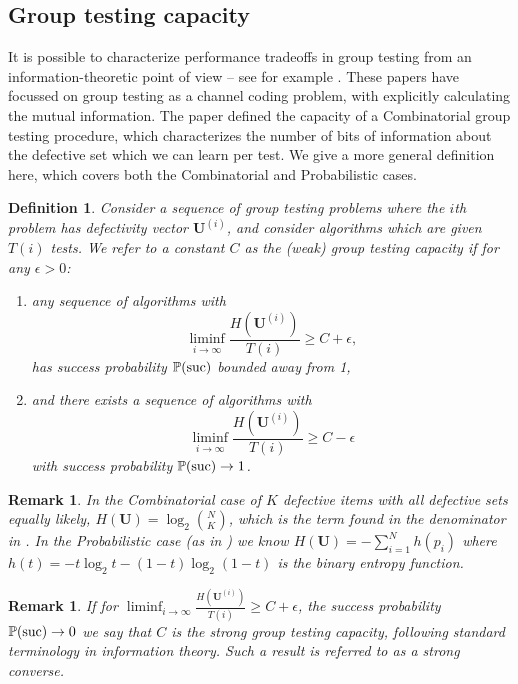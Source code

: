 \documentclass[conference]{IEEEtran}
\newtheorem{definition}[theorem]{Definition}
\newtheorem{remark}[theorem]{Remark}
\newcommand{\vc}[1]{{\mathbf{ #1}}}
\newcommand{\pr}{{\mathbb{P}}}
\newcommand{\suc}{{\rm suc}}
\newcommand{\tends}{\rightarrow \infty}
\begin{document}
\subsection{Group testing capacity}
%
It is possible to characterize performance tradeoffs in group testing 
 from an information-theoretic point of view -- see for example \cite{atia, johnsonc10, johnson33, tan}. These papers have focussed on group testing as a channel coding problem, 
with \cite{atia, tan}
explicitly calculating the mutual information.
The paper \cite{johnsonc10} defined the capacity of a Combinatorial group testing procedure, which characterizes the number of bits of information
about the defective set which we can learn per test. We give a more general definition here,
which covers both the Combinatorial and Probabilistic cases.
%
\begin{definition} \label{def:capacity} Consider a sequence of group testing problems where the $i$th problem
has defectivity vector  $\vc{U}^{(i)}$, and consider algorithms which are given $T(i)$ tests.
We refer to a constant $C$ as the (weak) group testing capacity if for any $\epsilon > 0$:
  \begin{enumerate}
    \item any sequence of algorithms with
      \begin{equation} \label{eq:lower}
        \liminf_{i \tends} \frac{ H(\vc{U}^{(i)}) }{T(i)} \geq C+ \epsilon,
      \end{equation}
      has success probability $\pr(\suc)$ bounded away from 1,
    \item and there exists a sequence of algorithms with
      \begin{equation} \label{eq:upper}
        \liminf_{i \tends} \frac{H(\vc{U}^{(i)}) }{T(i)}  \geq C - \epsilon
      \end{equation}
      with success probability $\pr(\suc) \rightarrow 1$.
  \end{enumerate}
\end{definition}
%
\begin{remark}
In the Combinatorial case of $K$ defective items with all defective sets equally
likely, $ H(\vc{U}) = \log_2 \binom{N}{K}$, which is the term found in the denominator in \cite[Eq. (1) and (2)]{johnsonc10}. In the Probabilistic case (as in \cite{li5}) 
 we know $H(\vc{U}) = -\sum_{i=1}^N h(p_i)$ where $h(t) = -t \log_2 t - (1-t) \log_2(1-t)$ is the binary entropy function. 
\end{remark}
%
\begin{remark} If for $ \liminf_{i \tends} \frac{ H(\vc{U}^{(i)}) }{T(i)} \geq C+ \epsilon$, the success probability 
$\pr(\suc) \rightarrow 0$ we say that $C$ is the strong group testing capacity, following standard terminology in information
theory. Such a result is referred to as a strong converse.
\end{remark}
\end{document}
